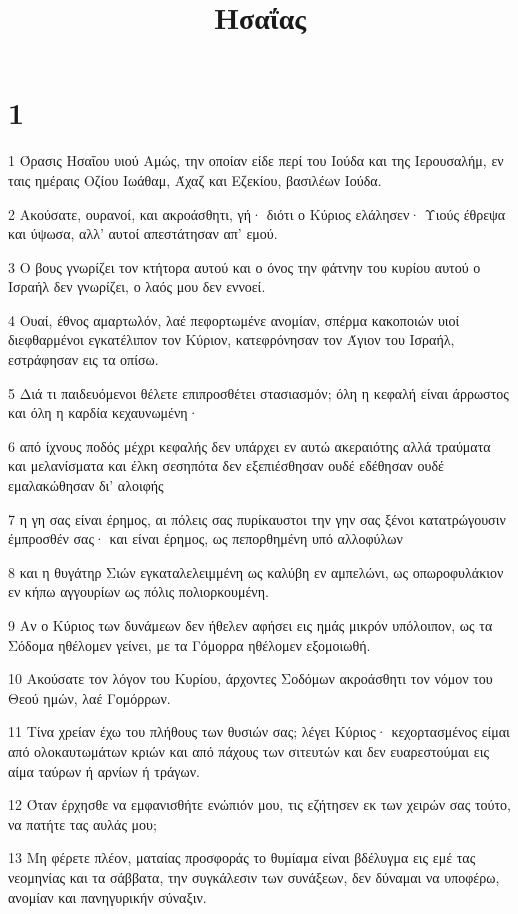 

\title{Ησαΐας}


\chapter{1}

\par 1 Όρασις Ησαΐου υιού Αμώς, την οποίαν είδε περί του Ιούδα και της Ιερουσαλήμ, εν ταις ημέραις Οζίου Ιωάθαμ, Άχαζ και Εζεκίου, βασιλέων Ιούδα.
\par 2 Ακούσατε, ουρανοί, και ακροάσθητι, γή· διότι ο Κύριος ελάλησεν· Υιούς έθρεψα και ύψωσα, αλλ' αυτοί απεστάτησαν απ' εμού.
\par 3 Ο βους γνωρίζει τον κτήτορα αυτού και ο όνος την φάτνην του κυρίου αυτού ο Ισραήλ δεν γνωρίζει, ο λαός μου δεν εννοεί.
\par 4 Ουαί, έθνος αμαρτωλόν, λαέ πεφορτωμένε ανομίαν, σπέρμα κακοποιών υιοί διεφθαρμένοι εγκατέλιπον τον Κύριον, κατεφρόνησαν τον Άγιον του Ισραήλ, εστράφησαν εις τα οπίσω.
\par 5 Διά τι παιδευόμενοι θέλετε επιπροσθέτει στασιασμόν; όλη η κεφαλή είναι άρρωστος και όλη η καρδία κεχαυνωμένη·
\par 6 από ίχνους ποδός μέχρι κεφαλής δεν υπάρχει εν αυτώ ακεραιότης αλλά τραύματα και μελανίσματα και έλκη σεσηπότα δεν εξεπιέσθησαν ουδέ εδέθησαν ουδέ εμαλακώθησαν δι' αλοιφής
\par 7 η γη σας είναι έρημος, αι πόλεις σας πυρίκαυστοι την γην σας ξένοι κατατρώγουσιν έμπροσθέν σας· και είναι έρημος, ως πεπορθημένη υπό αλλοφύλων
\par 8 και η θυγάτηρ Σιών εγκαταλελειμμένη ως καλύβη εν αμπελώνι, ως οπωροφυλάκιον εν κήπω αγγουρίων ως πόλις πολιορκουμένη.
\par 9 Αν ο Κύριος των δυνάμεων δεν ήθελεν αφήσει εις ημάς μικρόν υπόλοιπον, ως τα Σόδομα ηθέλομεν γείνει, με τα Γόμορρα ηθέλομεν εξομοιωθή.
\par 10 Ακούσατε τον λόγον του Κυρίου, άρχοντες Σοδόμων ακροάσθητι τον νόμον του Θεού ημών, λαέ Γομόρρων.
\par 11 Τίνα χρείαν έχω του πλήθους των θυσιών σας; λέγει Κύριος· κεχορτασμένος είμαι από ολοκαυτωμάτων κριών και από πάχους των σιτευτών και δεν ευαρεστούμαι εις αίμα ταύρων ή αρνίων ή τράγων.
\par 12 Όταν έρχησθε να εμφανισθήτε ενώπιόν μου, τις εζήτησεν εκ των χειρών σας τούτο, να πατήτε τας αυλάς μου;
\par 13 Μη φέρετε πλέον, ματαίας προσφοράς το θυμίαμα είναι βδέλυγμα εις εμέ τας νεομηνίας και τα σάββατα, την συγκάλεσιν των συνάξεων, δεν δύναμαι να υποφέρω, ανομίαν και πανηγυρικήν σύναξιν.
